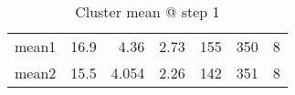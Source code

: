 \begin{table}[htbp]
  \centering
  \caption{Cluster mean @ step 1}
    \begin{tabular}{rrrrrrr}
    \toprule
    mean1 & 16.9  & 4.36  & 2.73  & 155   & 350   & 8 \\
    mean2 & 15.5  & 4.054 & 2.26  & 142   & 351   & 8 \\
    \bottomrule
    \end{tabular}%
  \label{tab:mean_a1}%
\end{table}%
